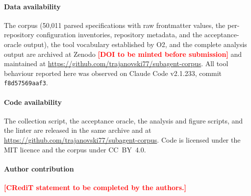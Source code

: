 \documentclass[smallextended,natbib]{svjour3}
\newcommand{\code}[1]{\texttt{\small #1}}
\newcommand{\authornote}[1]{\textcolor{red}{\textbf{[#1]}}}
\newcommand{\repourl}{https://github.com/trajanovski77/subagent-corpus}
\begin{document}
\paragraph{Data availability}
The corpus (50{,}011 parsed specifications with raw frontmatter values, the per-repository
configuration inventories, repository metadata, and the acceptance-oracle output), the tool
vocabulary established by O2, and the complete analysis output are archived at Zenodo
\authornote{DOI to be minted before submission} and maintained at \url{\repourl}.
All tool behaviour reported here was observed on Claude Code v2.1.233, commit \code{f8d57569aaf3}.

\paragraph{Code availability}
The collection script, the acceptance oracle, the analysis and figure scripts, and the linter are
released in the same archive and at \url{\repourl}. Code is licensed under the MIT licence and the
corpus under CC~BY~4.0.

\paragraph{Author contribution}
\authornote{CRediT statement to be completed by the authors.}



\end{document}
